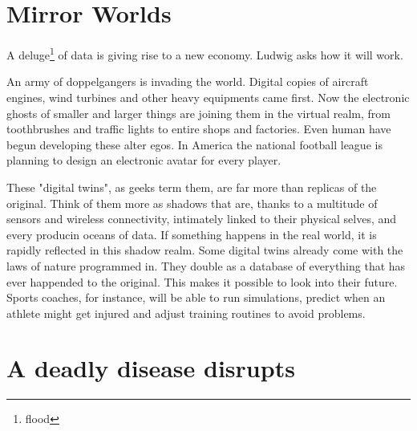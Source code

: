 \documentclass[a4paper,10pt]{article}
\begin{document}
\section{Mirror Worlds}

A deluge\footnote{flood} of data is giving rise to a new economy.
Ludwig asks how it will work.

An army of doppelgangers is invading the world.
Digital copies of aircraft engines, wind turbines and other heavy equipments came first.
Now the electronic ghosts of smaller and larger things are joining them in the virtual realm, from toothbrushes and traffic lights to entire shops and factories.
Even human have begun developing these alter egos.
In America the national football league is planning to design an electronic avatar for every player.

These "digital twins", as geeks term them, are far more than replicas of the original.
Think of them more as shadows that are, thanks to a multitude of sensors and wireless connectivity, intimately linked to their physical selves, and every producin oceans of data.
If something happens in the real world, it is rapidly reflected in this shadow realm.
Some digital twins already come with the laws of nature programmed in.
They double as a database of everything that has ever happended to the original.
This makes it possible to look into their future.
Sports coaches, for instance, will be able to run simulations, predict when an athlete might get injured and adjust training routines to avoid problems.

\section{A deadly disease disrupts}
\end{document}
